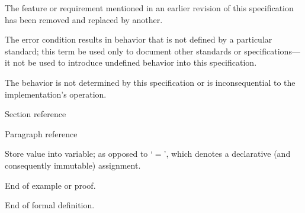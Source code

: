 \begin{description}
  The feature or requirement mentioned in an earlier revision of this
  specification has been removed and replaced by another.

  The error condition results in behavior that is not defined by a particular
  standard; this term \shall be used only to document other standards or
  specifications---it \shall not be used to introduce undefined behavior into
  this specification.

  The behavior is not determined by this specification or is inconsequential to
  the implementation's operation.

  \dt{\S}
  Section reference

  \dt{\P}
  Paragraph reference

  \dt{$\leftarrow$}
  Store value into variable; as opposed to `$=$', which denotes a declarative
  (and consequently immutable) assignment.

  \dt{$\square$}
  End of example or proof.

  \dt{$\blacksquare$}
  End of formal definition.
\end{description}

\enddeptgroup
